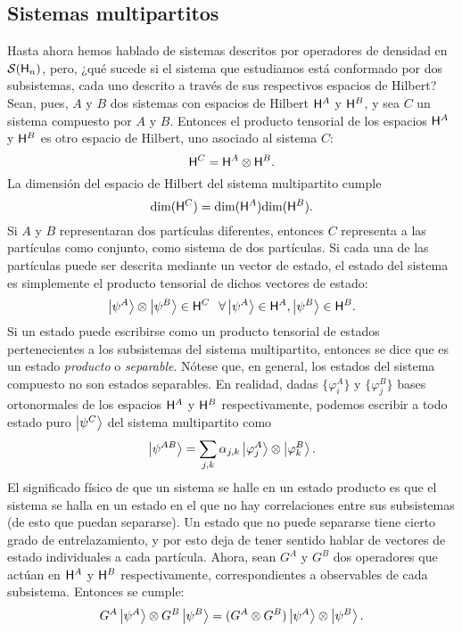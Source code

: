 \subsection{Sistemas multipartitos}\label{sec:Ch1PartialTrace}
Hasta ahora hemos hablado de sistemas descritos por operadores de densidad en $\mathcal{S}({\sf H}_{n})$, pero, ¿qué sucede si el sistema que estudiamos está conformado por dos subsistemas, cada uno descrito a través de sus respectivos espacios de Hilbert? Sean, pues, $A$ y $B$ dos sistemas con espacios de Hilbert ${\sf H}^{A}$ y ${\sf H}^{B}$, y sea $C$ un sistema compuesto por $A$ y $B$. Entonces el producto tensorial de los espacios ${\sf H}^{A}$ y ${\sf H}^{B}$ es otro espacio de Hilbert, uno asociado al sistema $C$:
 \begin{equation*}
     {\sf H}^{C}={\sf H}^{A}\otimes{\sf H}^{B}.
 \end{equation*}
 La dimensión del espacio de Hilbert del sistema multipartito cumple
\begin{equation*}
    \text{dim}({\sf H}^{C})=\text{dim}({\sf H}^{A})\text{dim}({\sf H}^{B}).
\end{equation*}
Si $A$ y $B$ representaran dos partículas diferentes, entonces $C$ representa a las partículas como conjunto, como sistema de dos partículas. Si cada una de las partículas puede ser descrita mediante un vector de estado, el estado del sistema es simplemente el producto tensorial de dichos vectores de estado:
\begin{equation*}
    \ket{\psi^{A}}\otimes\ket{\psi^{B}}\in{\sf H}^{C}\,\; \; \forall\ket{\psi^{A}}\in{\sf H}^{A},\ket{\psi^{B}}\in{\sf H}^{B}.
\end{equation*}
Si un estado puede escribirse como un producto tensorial de estados pertenecientes a los subsistemas del sistema multipartito, entonces se dice que es un estado \textit{producto} o \textit{separable}. Nótese que, en general, los estados del sistema compuesto no son estados separables. En realidad, dadas $\{\varphi_{i}^{A}\}$ y $\{\varphi_{j}^{B}\}$ bases ortonormales de los espacios ${\sf H}^{A}$ y ${\sf H}^{B}$ respectivamente, podemos escribir a todo estado puro $\ket{\psi^{C}}$ del sistema multipartito como
\begin{equation*}
    \ket{\psi^{AB}}=\sum_{j,k}\alpha_{j,k}\ket{\varphi_{j}^{A}}\otimes\ket{\varphi_{k}^{B}}.
\end{equation*}
El significado físico de que un sistema se halle en un estado producto es que el sistema se halla en un estado en el que no hay correlaciones entre sus subsistemas (de esto que puedan separarse). Un estado que no puede separarse tiene cierto grado de entrelazamiento, y por esto deja de tener sentido hablar de vectores de estado individuales a cada partícula. Ahora, sean $G^{A}$ y $G^{B}$ dos operadores que actúan en ${\sf H}^{A}$ y ${\sf H}^{B}$ respectivamente, correspondientes a observables de cada subsistema. Entonces se cumple:
\begin{equation*}
    G^{A}\ket{\psi^{A}}\otimes G^{B}\ket{\psi^{B}}=(G^{A}\otimes G^{B})\ket{\psi^{A}}\otimes\ket{\psi^{B}}.
\end{equation*}


